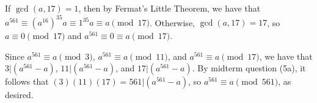If $\gcd (a, 17) = 1$, then by Fermat's Little Theorem,
we have that $a^{561} \equiv (a^{16})^{35} a \equiv 1^{35} a \equiv a \pmod{17}$.
Otherwise, $\gcd (a, 17) = 17$, so $a \equiv 0 \pmod{17}$ and
$a^{561} \equiv 0 \equiv a \pmod{17}$.

Since $a^{561} \equiv a \pmod 3$, $a^{561} \equiv a \pmod{11}$, and
$a^{561} \equiv a \pmod{17}$,
we have that $3 \vert (a^{561} - a)$, $11 \vert (a^{561} - a)$,
and $17 \vert (a^{561} - a)$.
By midterm question (5a), it follows that
$(3)(11)(17) = 561 \vert (a^{561} - a)$, so
$a^{561} \equiv a \pmod{561}$, as desired.
\bye

